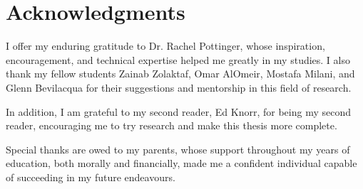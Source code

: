 
\chapter{Acknowledgments}

I offer my enduring gratitude to Dr. Rachel Pottinger, whose inspiration, encouragement, and technical expertise helped me greatly in my studies. I also thank my fellow students Zainab Zolaktaf, Omar AlOmeir, Mostafa Milani, and Glenn Bevilacqua for their suggestions and mentorship in this field of research.

In addition, I am grateful to my second reader, Ed Knorr, for being my second reader, encouraging me to try research and make this thesis more complete.

Special thanks are owed to my parents, whose support throughout my years of education, both morally and financially, made me a confident individual capable of succeeding in my future endeavours.
\endinput